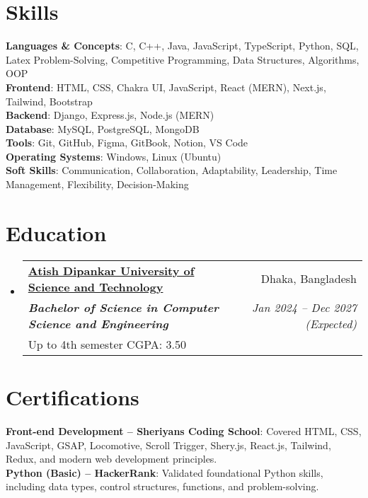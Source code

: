 \documentclass[a4paper,11pt]{article}
\makeatletter
\newcommand{\resumeEduSubheading}[6]{
  \vspace{-2pt}\item
    \begin{tabular*}{0.97\textwidth}[t]{l@{\extracolsep{\fill}}r}
      \textbf{\href{#1}{#2}} & #3 \\
      \textbf{\textit{\small #4}} & \textit{\small #5} \\
      {\small #6}
    \end{tabular*}\vspace{-7pt}
}
\newcommand{\resumeSubHeadingListStart}{\begin{itemize}[leftmargin=0.15in, label={}]}
\newcommand{\resumeSubHeadingListEnd}{\end{itemize}}
\makeatother
\begin{document}
\section{\textbf{Skills}}
 \begin{itemize}[leftmargin=0.15in, label={}]
    \small{\item{
     \textbf{Languages \& Concepts}{: C, C++, Java, JavaScript, TypeScript, Python, SQL, Latex Problem-Solving, Competitive Programming, Data Structures, Algorithms, OOP} \\
     \textbf{Frontend}{: HTML, CSS, Chakra UI, JavaScript, React (MERN), Next.js, Tailwind, Bootstrap} \\
     \textbf{Backend}{: Django, Express.js, Node.js (MERN)} \\
     \textbf{Database}{: MySQL, PostgreSQL, MongoDB} \\
     \textbf{Tools}{: Git, GitHub, Figma, GitBook, Notion, VS Code} \\
     \textbf{Operating Systems}{: Windows, Linux (Ubuntu)} \\
     \textbf{Soft Skills}{: Communication, Collaboration, Adaptability, Leadership, Time Management, Flexibility, Decision-Making}
    }}
 \end{itemize}

\section{\textbf{Education}}
  \resumeSubHeadingListStart
    \resumeEduSubheading
      {https://www.adust.edu.bd/\#}{Atish Dipankar University of Science and Technology}{Dhaka, Bangladesh}
      {Bachelor of Science in Computer Science and Engineering }{Jan 2024 -- Dec 2027 (Expected)}
      {Up to 4th semester CGPA: 3.50}
  \resumeSubHeadingListEnd

\section{\textbf{Certifications}}
  \begin{itemize}[leftmargin=0.15in, label={}]
    \small{\item{
      \textbf{Front-end Development – Sheriyans Coding School}{: Covered HTML, CSS, JavaScript, GSAP, Locomotive, Scroll Trigger, Shery.js, React.js, Tailwind, Redux, and modern web development principles.} \\
      \textbf{Python (Basic) – HackerRank}{: Validated foundational Python skills, including data types, control structures, functions, and problem-solving.}
    }}
  \end{itemize}
\end{document}
